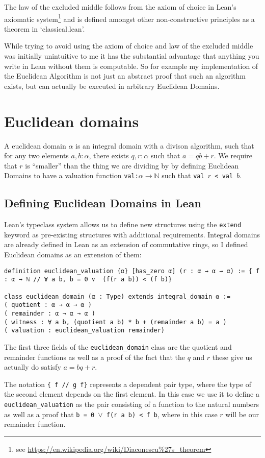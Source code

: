 \documentclass{article}
\newcommand{\N}{\ensuremath{\mathbb{N}}}
\renewcommand{\a}{\alpha}
\newcommand{\ct}{\texttt}
\begin{document}
The law of the excluded middle follows from the axiom of choice in Lean's axiomatic system\footnote{see \url{https://en.wikipedia.org/wiki/Diaconescu\%27s\_theorem}} and is defined amongst other non-constructive principles as a theorem in `classical.lean'. 

While trying to avoid using the axiom of choice and law of the excluded middle was initially unintuitive to me it has the substantial advantage that anything you write in Lean without them is computable.
So for example my implementation of the Euclidean Algorithm is not just an abstract proof that such an algorithm exists, but can actually be executed in arbitrary Euclidean Domains.

\section{Euclidean domains}
A euclidean domain $\a$ is an integral domain with a divison algorithm, such that for any two elements $a,b :\a$, there exists $q,r : \a$ such that $a=qb+r$.
We require that $r$ is ``smaller'' than the thing we are dividing by by defining Euclidean Domains to have a valuation function \ct{val:$\a \to \N$} such that \ct{val $r$ < val $b$}.

\subsection{Defining Euclidean Domains in Lean}
Lean's typeclass system allows us to define new structures using the \ct{extend} keyword as pre-existing structures with additional requirements.
Integral domains are already defined in Lean as an extension of commutative rings, so I defined Euclidean domains as an extension of them:
\begin{lstlisting}
definition euclidean_valuation {α} [has_zero α] (r : α → α → α) := { f : α → ℕ // ∀ a b, b = 0 ∨  (f(r a b)) < (f b)}

class euclidean_domain (α : Type) extends integral_domain α :=
( quotient : α → α → α )
( remainder : α → α → α )
( witness : ∀ a b, (quotient a b) * b + (remainder a b) = a )
( valuation : euclidean_valuation remainder)
\end{lstlisting}

The first three fields of the \ct{euclidean\_domain} class are the quotient and remainder functions as well as a proof of the fact that the $q$ and $r$ these give us actually do satisfy $a=bq+r$.

The notation \ct{\{ f // g f\}} represents a dependent pair type, where the type of the second element depends on the first element.
In this case we use it to define a \ct{euclidean\_valuation} as the pair consisting of a function to the natural numbers as well as a proof that \ct{b = 0 $\lor$ f(r a b) < f b}, where in this case $r$ will be our remainder function.
\end{document}
